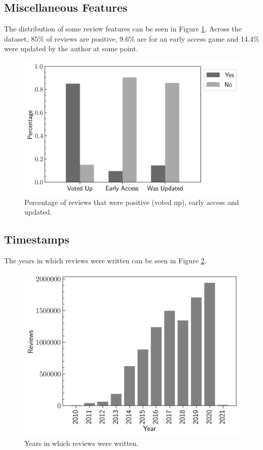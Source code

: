 \subsection{Miscellaneous Features}

The distribution of some review features can be seen in Figure \ref{fig:Dataset_BarsCounts}. Across the dataset, 85\% of reviews are positive, 9.6\% are for an early access game and 14.4\% were updated by the author at some point.

\begin{figure}[ht]
    \centering
    \includegraphics[scale=0.55]{figures/03_dataset/08_bars_counts.png}
    \caption{Percentage of reviews that were positive (voted up), early access and updated.}
    \label{fig:Dataset_BarsCounts}
\end{figure}

\subsection{Timestamps}

The years in which reviews were written can be seen in Figure \ref{fig:Dataset_BarsTimestamps}.

\begin{figure}[ht]
    \centering
    \includegraphics[scale=0.55]{figures/03_dataset/09_bars_review_dates.png}
    \caption{Years in which reviews were written.}
    \label{fig:Dataset_BarsTimestamps}
\end{figure}

